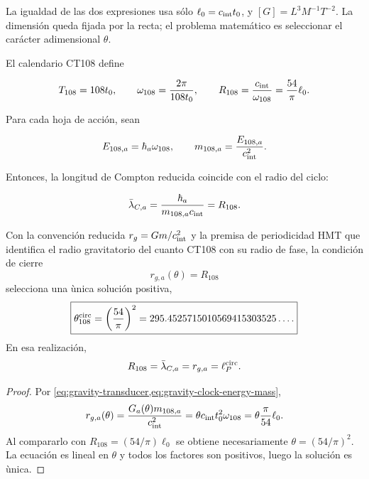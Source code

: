 La igualdad de las dos expresiones usa s\'olo
\(\ell_0=c_{\rm int}t_0\), y
\([G]=L^3M^{-1}T^{-2}\). La dimensi\'on queda fijada por la recta; el
problema matem\'atico es seleccionar el car\'acter adimensional \(\theta\).

El calendario CT108 define

\begin{equation}
\label{eq:gravity-clock108}
T_{108}=108t_0,
\qquad
\omega_{108}=\frac{2\pi}{108t_0},
\qquad
R_{108}=\frac{c_{\rm int}}{\omega_{108}}
=\frac{54}{\pi}\ell_0.
\end{equation}

Para cada hoja de acci\'on, sean

\begin{equation}
\label{eq:gravity-clock-energy-mass}
E_{108,a}=\hbar_a\omega_{108},
\qquad
m_{108,a}=\frac{E_{108,a}}{c_{\rm int}^2}.
\end{equation}

Entonces, la longitud de Compton reducida coincide con el radio del ciclo:

\begin{equation}
\label{eq:gravity-compton-clock}
\bar\lambda_{C,a}
=\frac{\hbar_a}{m_{108,a}c_{\rm int}}
=R_{108}.
\end{equation}

\begin{theorem}
\label{thm:gravity-circular-selector}
Con la convenci\'on reducida
\(r_g=Gm/c_{\rm int}^2\) y la premisa de periodicidad HMT que identifica el radio
gravitatorio del cuanto CT108 con su radio de fase, la condici\'on de cierre
\begin{equation}
\label{eq:gravity-closing-condition}
r_{g,a}(\theta)=R_{108}
\end{equation}
selecciona una \`unica soluci\'on positiva,
\begin{equation}
\label{eq:gravity-theta108}
\boxed{
\theta_{108}^{\rm circ}=\left(\frac{54}{\pi}\right)^2
=295.4525715010569415303525\ldots .}
\end{equation}
En esa realizaci\'on,
\begin{equation}
\label{eq:gravity-four-lengths}
R_{108}=\bar\lambda_{C,a}=r_{g,a}=\ell_P^{\rm circ}.
\end{equation}
\end{theorem}

\begin{proof}
Por \cref{eq:gravity-transducer,eq:gravity-clock-energy-mass},
\[
r_{g,a}(\theta)
=\frac{G_a(\theta)m_{108,a}}{c_{\rm int}^2}
=\theta c_{\rm int}t_0^2\omega_{108}
=\theta\frac{\pi}{54}\ell_0.
\]
Al compararlo con
\(R_{108}=(54/\pi)\ell_0\) se obtiene necesariamente
\(\theta=(54/\pi)^2\). La ecuaci\'on es lineal en \(\theta\) y todos los
factores son positivos, luego la soluci\'on es \`unica.
\end{proof}

